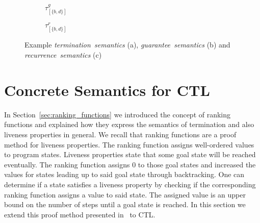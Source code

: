 \documentclass[11pt,a4paper,titlepage]{article}
\theoremstyle{definition}
\begin{document}
\begin{figure}
\begin{subfigure}[b]{0.32\textwidth}
        \caption{$\tau_{[\{b, d\}]}^{g}$}
    \end{subfigure}
    \begin{subfigure}[b]{0.32\textwidth}
        \centering
        \caption{$\tau_{[\{b, d\}]}^{r}$}
    \end{subfigure}
    \caption{
        Example \textit{termination\ semantics} (a), 
        \textit{guarantee\ semantics} (b) and
        \textit{recurrence\ semantics} (c)
    } 
    \label{fig:ranking_functios_example}
\end{figure}

\section{Concrete Semantics for CTL}\label{sec:ctl_semantics}

In Section~\ref{sec:ranking_functions} we introduced the concept of ranking functions and explained how they express the semantics of 
termination and also liveness properties in general. We recall that ranking functions are a proof method for liveness properties. 
The ranking function assigns well-ordered values to program states. 
Liveness properties state that some goal state will be reached eventually. The ranking function assigns $0$ to those goal states 
and increased the values for states leading up to said goal state through backtracking.
One can determine if a state satisfies a liveness property by checking if the corresponding ranking function
assigns a value to said state. The assigned value is an upper bound on the number of steps until a goal state is reached.
In this section we extend this proof method presented in~\cite{UrbanPhd} to CTL.\\
\end{document}
